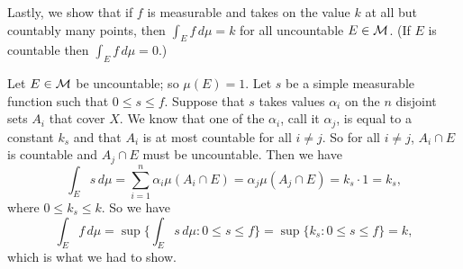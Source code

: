 Lastly, we show that if $f$ is measurable and takes on the value $k$ at all but countably many points, then $\int_E f\,d\mu = k$ for all uncountable $E\in {\cal M}$. (If $E$ is countable then $\int_E f\,d\mu = 0$.)

\proof Let $E\in {\cal M}$ be uncountable; so $\mu(E) = 1$. Let $s$ be a simple measurable function such that $0\leq s\leq f$. Suppose that $s$ takes values $\alpha_i$ on the $n$ disjoint sets $A_i$ that cover $X$. We know that one of the $\alpha_i$, call it $\alpha_j$, is equal to a constant $k_s$ and that $A_i$ is at most countable for all $i \neq j$. So for all $i \neq j$, $A_i \cap E$ is countable and $A_j \cap E$ must be uncountable. Then we have
$$\int_E s\,d\mu = \sum_{i=1}^n \alpha_i \mu(A_i\cap E) = \alpha_j\mu(A_j\cap E) = k_s\cdot 1 = k_s,$$
where $0\leq k_s \leq k$. So we have
$$\int_E f\,d\mu = \sup \Big\{ \int_E s\,d\mu : 0 \leq s\leq f\Big\} = \sup \{k_s : 0\leq s \leq f\} = k,$$
which is what we had to show.\slug
\bye
